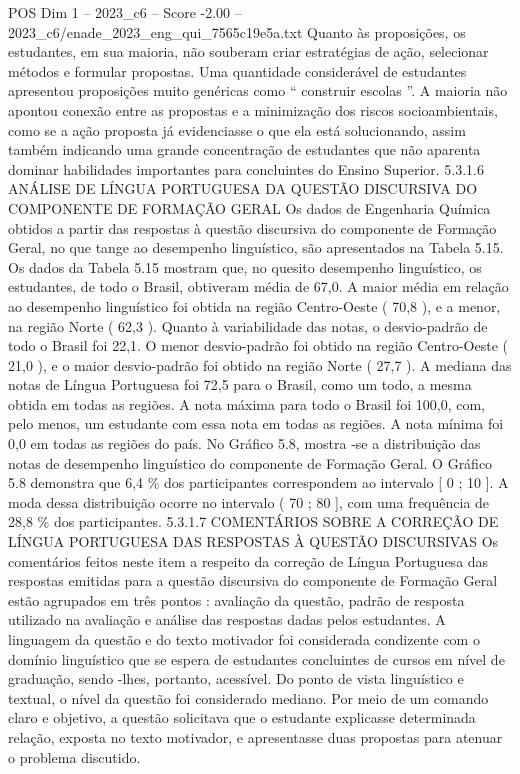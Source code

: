 \begin{textsample}{POS Dim 1 – 2023\_c6 – Score -2.00 – 2023\_c6/enade\_2023\_eng\_qui\_7565c19e5a.txt}
Quanto às proposições, os estudantes, em sua maioria, não souberam criar estratégias de ação, selecionar métodos e formular propostas.
Uma quantidade considerável de estudantes apresentou proposições muito genéricas como “ construir escolas ”.
A maioria não apontou conexão entre as propostas e a minimização dos riscos socioambientais, como se a ação proposta já evidenciasse o que ela está solucionando, assim também indicando uma grande concentração de estudantes que não aparenta dominar habilidades importantes para concluintes do Ensino Superior. 5.3.1.6 ANÁLISE DE LÍNGUA PORTUGUESA DA QUESTÃO DISCURSIVA DO COMPONENTE DE FORMAÇÃO GERAL Os dados de Engenharia Química obtidos a partir das respostas à questão discursiva do componente de Formação Geral, no que tange ao desempenho linguístico, são apresentados na Tabela 5.15.
Os dados da Tabela 5.15 mostram que, no quesito desempenho linguístico, os estudantes, de todo o Brasil, obtiveram média de 67,0.
A maior média em relação ao desempenho linguístico foi obtida na região Centro-Oeste ( 70,8 ), e a menor, na região Norte ( 62,3 ).
Quanto à variabilidade das notas, o desvio-padrão de todo o Brasil foi 22,1.
O menor desvio-padrão foi obtido na região Centro-Oeste ( 21,0 ), e o maior desvio-padrão foi obtido na região Norte ( 27,7 ).
A mediana das notas de Língua Portuguesa foi 72,5 para o Brasil, como um todo, a mesma obtida em todas as regiões.
A nota máxima para todo o Brasil foi 100,0, com, pelo menos, um estudante com essa nota em todas as regiões.
A nota mínima foi 0,0 em todas as regiões do país.
No Gráfico 5.8, mostra -se a distribuição das notas de desempenho linguístico do componente de Formação Geral.
O Gráfico 5.8 demonstra que 6,4 \% dos participantes correspondem ao intervalo [ 0 ; 10 ].
A moda dessa distribuição ocorre no intervalo ( 70 ; 80 ], com uma frequência de 28,8 \% dos participantes. 5.3.1.7 COMENTÁRIOS SOBRE A CORREÇÃO DE LÍNGUA PORTUGUESA DAS RESPOSTAS À QUESTÃO DISCURSIVAS Os comentários feitos neste item a respeito da correção de Língua Portuguesa das respostas emitidas para a questão discursiva do componente de Formação Geral estão agrupados em três pontos : avaliação da questão, padrão de resposta utilizado na avaliação e análise das respostas dadas pelos estudantes.
A linguagem da questão e do texto motivador foi considerada condizente com o domínio linguístico que se espera de estudantes concluintes de cursos em nível de graduação, sendo -lhes, portanto, acessível.
Do ponto de vista linguístico e textual, o nível da questão foi considerado mediano.
Por meio de um comando claro e objetivo, a questão solicitava que o estudante explicasse determinada relação, exposta no texto motivador, e apresentasse duas propostas para atenuar o problema discutido.

\end{textsample}
